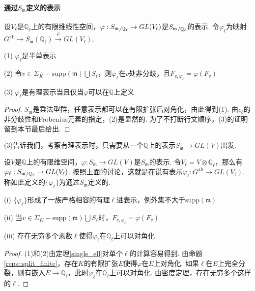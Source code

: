 \paragraph{通过\texorpdfstring{$S_{\mathfrak{m}}$}{Sm}定义的表示}
设$V_{\ell}$是$\mathbb{Q}_{\ell}$上的有限维线性空间，$\varphi: {S_{\mathfrak{m}}}_{/\mathbb{Q}_{\ell}} \to GL(V_{\ell})$是${S_{\mathfrak{m}}}_{/\mathbb{Q}_{\ell}}$的表示. 令$\varphi_{\ell}$为映射$G^{\mathrm{ab}}\to S_{\mathfrak{m}}(\mathbb{Q}_{\ell})\xrightarrow{\varphi} GL(V_{\ell})$.

\begin{cthm}
    (1) $\varphi_{\ell}$是半单表示

    (2) 令$v\in \Sigma_K - \mathrm{supp}(\mathfrak{m})\bigcup S_{\ell}$，则$\varphi_{\ell}$在$v$处非分歧，且$F_{v, \varphi_{\ell}} = \varphi(F_v)$

    (3) $\varphi_{\ell}$是有理表示当且仅当$\varphi$可以在$\mathbb{Q}$上定义 \label{single_ell}
\end{cthm}

\begin{proof}
    $S_{\mathfrak{m}}$是乘法型群，任意表示都可以在有限扩张后对角化，由此得到(1). 由$\epsilon_{\ell}$的非分歧性和Frobenius元素的指定，(2)是显然的.
    为了不打断行文顺序，(3)的证明留到本节最后给出.
\end{proof}

(3)告诉我们，考察有理表示时，只需要从一个$\mathbb{Q}$上的表示$S_{\mathfrak{m}}\to GL(V)$出发.

设$V$是$\mathbb{Q}$上的有限维空间，$\varphi: S_{\mathfrak{m}}\to GL(V)$是$S_{\mathfrak{m}}$的表示. 令$V_{\ell} = V\otimes \mathbb{Q}_{\ell}$，那么有$\varphi_{\ell}: {S_{\mathfrak{m}}}_{/\mathbb{Q}_{\ell}}\to GL(V_{\ell})$. 按照上面的讨论，这就是在说有表示$\varphi_{\ell}: G^{\mathrm{ab}}\to GL(V_{\ell})$. 称如此定义的$\{\varphi_{\ell}\}$为通过$S_{\mathfrak{m}}$定义的.

\begin{cthm}
    (i) $\{\varphi_{\ell}\}$形成了一族严格相容的有理$\ell$进表示，例外集不大于$\mathrm{supp}(\mathfrak{m})$

    (ii) 当$v\in \Sigma_K - \mathrm{supp}(\mathfrak{m})\bigcup S_{\ell}$时，$F_{v, \varphi_{\ell}} = \varphi(F_v)$

    (iii) 存在无穷多个素数$\ell$使得$\varphi_{\ell}$在$\mathbb{Q}_{\ell}$上可以对角化
    \label{reps::finite_diagonal}
\end{cthm}

\begin{proof}
    (1)和(2)由定理\ref{single_ell}对单个$\ell$的计算容易得到. 由命题\ref{reps::split_finite}，存在$K$的有限扩张$E$使得$\varphi$在$E$上对角化. 如果$\ell$在$E$上完全分裂，则有嵌入$E\to \mathbb{Q}_{\ell}$，此时$\varphi_{\ell}$在$\mathbb{Q}_{\ell}$上可以对角化. 由\Chebotarev 密度定理，存在无穷多个这样的$\ell$.
\end{proof}

